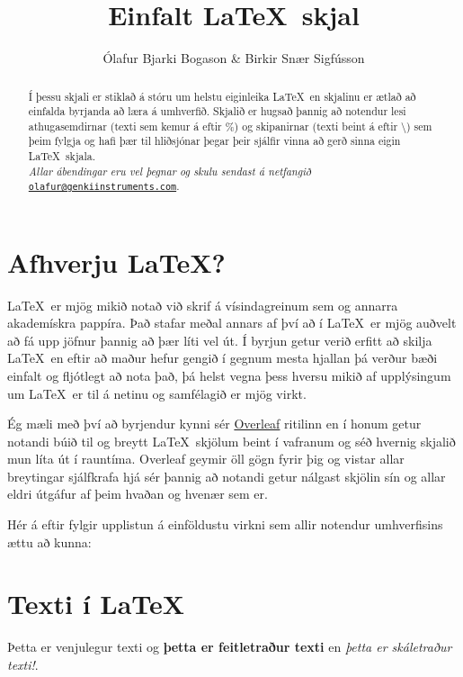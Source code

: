 \documentclass[a4paper]{article}
\title{Einfalt \LaTeX\ skjal}	%
\author{Ólafur Bjarki Bogason \& Birkir Snær Sigfússon}				%
\begin{document}
\maketitle

\begin{abstract}	%
	Í þessu skjali er stiklað á stóru um helstu eiginleika \LaTeX\ en skjalinu er ætlað að einfalda byrjanda að læra á umhverfið. Skjalið er hugsað þannig að notendur lesi athugasemdirnar (texti sem kemur á eftir \%) og skipanirnar (texti beint á eftir \textbackslash) sem þeim fylgja og hafi þær til hliðsjónar þegar þeir sjálfir vinna að gerð sinna eigin \LaTeX\ skjala.\\

\noindent \textit{Allar ábendingar eru vel þegnar og skulu sendast á netfangið } \href{mailto:obb7@hi.is}{\nolinkurl{olafur@genkiinstruments.com}}. 
\end{abstract}

\tableofcontents

\listoffigures


\section{Afhverju \LaTeX?}
\LaTeX\ er mjög mikið notað við skrif á vísindagreinum sem og annarra akademískra pappíra. Það stafar meðal annars af því að í \LaTeX\ er mjög auðvelt að fá upp jöfnur þannig að þær líti vel út. Í byrjun getur verið erfitt að skilja \LaTeX\ en eftir að maður hefur gengið í gegnum mesta hjallan þá verður bæði einfalt og fljótlegt að nota það, þá helst vegna þess hversu mikið af upplýsingum um \LaTeX\ er til á netinu og samfélagið er mjög virkt.

Ég mæli með því að byrjendur kynni sér \href{https://www.overleaf.com}{Overleaf} ritilinn en í honum getur notandi búið til og breytt \LaTeX\ skjölum beint í vafranum  og séð  hvernig skjalið mun líta út í rauntíma. Overleaf geymir öll gögn fyrir þig og vistar allar breytingar sjálfkrafa hjá sér þannig að notandi getur nálgast skjölin sín og allar eldri útgáfur af þeim hvaðan og hvenær sem er.

Hér á eftir fylgir upplistun á einföldustu virkni sem allir notendur umhverfisins ættu að kunna:

\section{Texti í \LaTeX}
Þetta er venjulegur texti og \textbf{þetta er feitletraður texti} en \textit{þetta er skáletraður texti!}.
\end{document}
